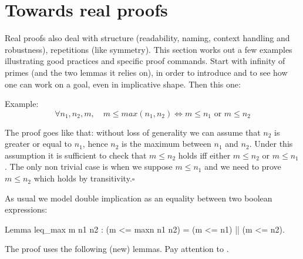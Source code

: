 

\section{Towards real proofs}

Real proofs also deal with structure (readability, naming, context handling and
robustness), repetitions (like symmetry).  This section works out a few
examples illustrating good practices and specific proof
commands. Start with infinity of primes (and the two lemmas it relies
on), in order to introduce  and to see how one can work on a
goal, even in implicative shape. Then this one:

Example:
$$
\forall n_1, n_2, m, \quad m \le max(n_1,n_2)
\Leftrightarrow m \le n_1 \textrm{ or } m \le n_2
$$

The proof goes like that: without loss of generality we can assume that
$n_2$ is greater or equal to $n_1$, hence $n_2$ is the maximum between
$n_1$ and $n_2$.  Under this assumption it is sufficient to check
that $m \le n_2$ holds iff either $m \le n_2$ or $m \le n_1$.
The only non trivial case is when we suppose $m \le n_1$ and
we need to prove $m \le n_2$ which holds by transitivity.\hfill$\square$

As usual we model double implication as an equality between two
boolean expressions:

\begin{coq}{}{}
Lemma leq_max m n1 n2 : (m <= maxn n1 n2) = (m <= n1) || (m <= n2).
\end{coq}

The proof uses the following (new) lemmas.  Pay attention to
.

